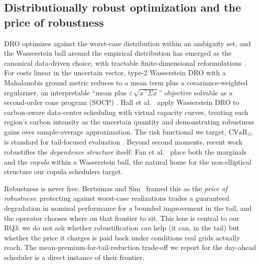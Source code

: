 \documentclass[10pt,twocolumn]{article}
\newcommand{\CVaR}{\mathrm{CVaR}}
\begin{document}
\subsection{Distributionally robust optimization and the price of robustness}
DRO optimizes against the worst-case distribution within an ambiguity set, and the
Wasserstein ball around the empirical distribution has emerged as the canonical
data-driven choice, with tractable finite-dimensional reformulations
\citep{esfahani2018,kuhn2019}. For costs linear in the uncertain vector, type-2
Wasserstein DRO with a Mahalanobis ground metric reduces to a mean term plus a
covariance-weighted regularizer, an interpretable ``mean plus
$\varepsilon\,\sqrt{x^\top\Sigma x}$'' objective solvable as a second-order cone
program (SOCP) \citep{blanchet2019}. Hall et al.~\citep{hall2024} apply Wasserstein DRO to
carbon-aware data-center scheduling with virtual capacity curves, treating each
region's carbon intensity as the uncertain quantity and demonstrating robustness
gains over sample-average approximation. The risk functional we target,
$\CVaR_{\beta}$, is standard for tail-focused evaluation \citep{rockafellar2000}.
Beyond second moments, recent work robustifies the \emph{dependence structure}
itself: Fan et al.~\citep{fan2024} place both the marginals and the \emph{copula} within a
Wasserstein ball, the natural home for the non-elliptical structure our copula
schedulers target.

Robustness is never free. Bertsimas and Sim~\citep{bertsimas2004} framed this as the
\emph{price of robustness}: protecting against worst-case realizations trades a
guaranteed degradation in nominal performance for a bounded improvement in the tail, and
the operator chooses where on that frontier to sit. This lens is central to our RQ3: we
do not ask whether robustification \emph{can} help (it can, in the tail) but whether the
price it charges is paid back under conditions real grids actually reach. The
mean-premium-for-tail-reduction trade-off we report for the day-ahead scheduler is a
direct instance of their frontier.
\end{document}
